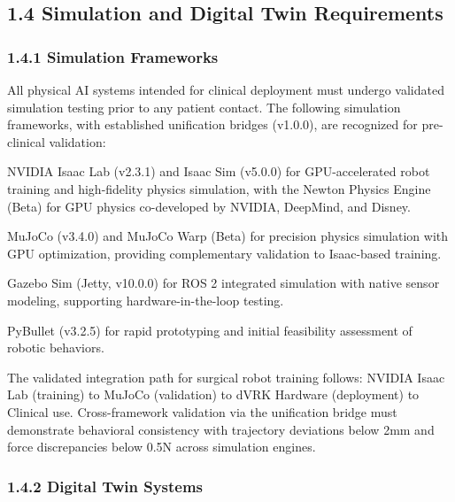 \documentclass[11pt]{article}
\begin{document}
\subsection{1.4 Simulation and Digital Twin Requirements}

\subsubsection{1.4.1 Simulation Frameworks}

All physical AI systems intended for clinical deployment must undergo validated simulation testing prior to any patient contact. The following simulation frameworks, with established unification bridges (v1.0.0), are recognized for pre-clinical validation:

\begin{description}[leftmargin=2.5cm,style=sameline]

\item[(a)] NVIDIA Isaac Lab (v2.3.1) and Isaac Sim (v5.0.0) for GPU-accelerated robot training and high-fidelity physics simulation, with the Newton Physics Engine (Beta) for GPU physics co-developed by NVIDIA, DeepMind, and Disney.

\item[(b)] MuJoCo (v3.4.0) and MuJoCo Warp (Beta) for precision physics simulation with GPU optimization, providing complementary validation to Isaac-based training.

\item[(c)] Gazebo Sim (Jetty, v10.0.0) for ROS 2 integrated simulation with native sensor modeling, supporting hardware-in-the-loop testing.

\item[(d)] PyBullet (v3.2.5) for rapid prototyping and initial feasibility assessment of robotic behaviors.

\end{description}

The validated integration path for surgical robot training follows: NVIDIA Isaac Lab (training) to MuJoCo (validation) to dVRK Hardware (deployment) to Clinical use. Cross-framework validation via the unification bridge must demonstrate behavioral consistency with trajectory deviations below 2mm and force discrepancies below 0.5N across simulation engines.

\subsubsection{1.4.2 Digital Twin Systems}
\end{document}
